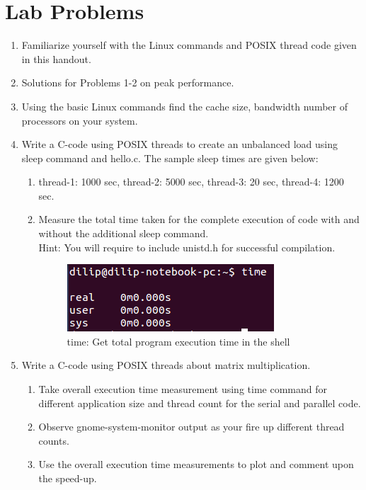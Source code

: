 \documentclass{sem5}
\begin{document}
\section*{Lab Problems}
\begin{enumerate}
\item Familiarize yourself with the Linux commands and POSIX thread code given in this handout.
\item Solutions for Problems 1-2 on peak performance.
\item Using the basic Linux commands find the cache size, bandwidth number of processors on your system.
\item Write a C-code using POSIX threads to create an unbalanced load using sleep command and hello.c. The sample sleep times are given below:
\begin{enumerate}
\item thread-1: 1000 sec, thread-2: 5000 sec, thread-3: 20 sec, thread-4: 1200 sec.
\item Measure the total time taken for the complete execution of code with and without the additional sleep command.\\
Hint: You will require to include unistd.h for successful compilation.
\begin{figure}[!htp]
\centering
\includegraphics[scale=1]{3.png}
\caption{time: Get total program execution time in the shell}
\end{figure}
\end{enumerate}
\item Write a C-code using POSIX threads about matrix multiplication.
\begin{enumerate}
\item Take overall execution time measurement using time command for different application size and thread count for the serial and parallel code.
\item Observe gnome-system-monitor output as your fire up different thread counts.
\item Use the overall execution time measurements to plot and comment upon the speed-up.
\end{enumerate}
\end{enumerate}
\end{document}
